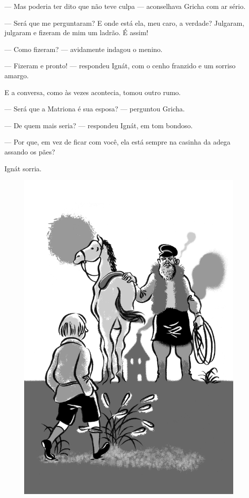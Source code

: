 --- Mas poderia ter dito que não teve culpa --- aconselhava Gricha com
ar sério.

--- Será que me perguntaram? E onde está ela, meu caro, a verdade?
Julgaram, julgaram e fizeram de mim um ladrão. É assim!

--- Como fizeram? --- avidamente indagou o menino.

--- Fizeram e pronto! --- respondeu Ignát, com o cenho franzido e um
sorriso amargo.

E a conversa, como às vezes acontecia, tomou outro rumo.

--- Será que a Matriona é sua esposa? --- perguntou Gricha.

--- De quem mais seria? --- respondeu Ignát, em tom bondoso.

--- Por que, em vez de ficar com você, ela está sempre na casinha da
adega assando os pães?

Ignát sorria.

\begin{figure}%
\vspace*{-1.6cm}
\hspace*{-2cm}\includegraphics[width=140mm]{./imgs/cena9.jpg}
\end{figure}

